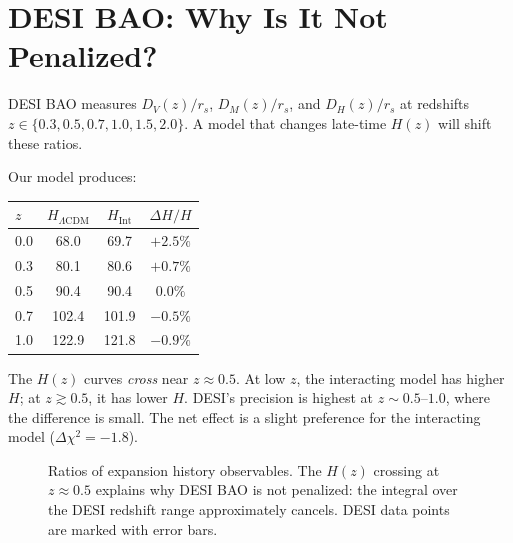 \documentclass[twocolumn,showpacs,preprintnumbers,amsmath,amssymb,prd]{revtex4-2}
\begin{document}
\section{DESI BAO: Why Is It Not Penalized?}
\label{sec:desi}

DESI BAO measures $D_V(z)/r_s$, $D_M(z)/r_s$, and $D_H(z)/r_s$ at redshifts $z \in \{0.3, 0.5, 0.7, 1.0, 1.5, 2.0\}$. A model that changes late-time $H(z)$ will shift these ratios.

Our model produces:
\begin{center}
\begin{tabular}{lccc}
\toprule
$z$ & $H_{\Lambda\text{CDM}}$ & $H_{\text{Int}}$ & $\Delta H/H$ \\
\midrule
0.0 & 68.0 & 69.7 & $+2.5\%$ \\
0.3 & 80.1 & 80.6 & $+0.7\%$ \\
0.5 & 90.4 & 90.4 & $0.0\%$ \\
0.7 & 102.4 & 101.9 & $-0.5\%$ \\
1.0 & 122.9 & 121.8 & $-0.9\%$ \\
\bottomrule
\end{tabular}
\end{center}

The $H(z)$ curves \textit{cross} near $z \approx 0.5$. At low $z$, the interacting model has higher $H$; at $z \gtrsim 0.5$, it has lower $H$. DESI's precision is highest at $z \sim 0.5$--$1.0$, where the difference is small. The net effect is a slight preference for the interacting model ($\Delta\chi^2 = -1.8$).

\begin{figure}[h]
\centering
{}
\caption{Ratios of expansion history observables. The $H(z)$ crossing at $z \approx 0.5$ explains why DESI BAO is not penalized: the integral over the DESI redshift range approximately cancels. DESI data points are marked with error bars.}
\label{fig:Hz_ratio}
\end{figure}
\end{document}
